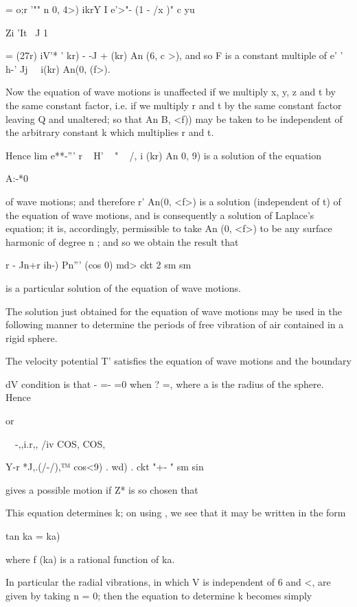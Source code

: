 = o;r '"" n 0, 4>) ikrY I e'>"- (1 - /x )" c yu

Zi  'It \ J 1

= (27r) iV'* ' kr) - -J + (kr) An (6, c >), and so F is a constant
multiple of e' ' h-' Jj \ \ i(kr) An(0, (f>).

Now the equation of wave motions is unaffected if we multiply x, y, z
and t by the same constant factor, i.e. if we multiply r and t by the
same constant factor leaving Q and unaltered; so that An B, <f)) may
be taken to be independent of the arbitrary constant k which
multiplies r and t.

Hence lim e**-''' r ~ H' ~ " ~ /, i (kr) An 0, 9) is a solution of
the equation

A:-*0

of wave motions; and therefore r' An(0, <f>) is a solution
(independent of t) of the equation of wave motions, and is
consequently a solution of Laplace's equation; it is, accordingly,
permissible to take An (0, <f>) to be any surface harmonic of degree n
; and so we obtain the result that

r - Jn+r ih-) Pn''' (cos 0) md> ckt 2 sm sm

is a particular solution of the equation of wave motions.

%
%


The solution just obtained for the equation of wave motions may be
used in the following manner to determine the periods of free
vibration of air contained in a rigid sphere.

The velocity potential T' satisfies the equation of wave motions and
the boundary

dV condition is that - =- =0 when ? =, where a is the radius of the
sphere. Hence

or

~\ -,,i.r,, /iv COS, COS,

Y-r *J,.(/-/),™ cos<9) . wd) . ckt "+- " sm sin

gives a possible motion if Z* is so chosen that

This equation determines k; on using , we see that it may be
written in the form

tan ka = ka)

where f (ka) is a rational function of ka.

In particular the radial vibrations, in which V is independent of 6
and <, are given by taking n = 0; then the equation to determine k
becomes simply

